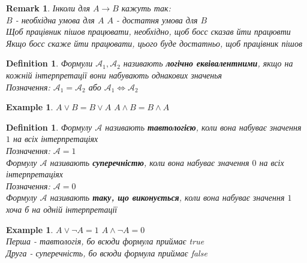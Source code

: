 \documentclass[a4paper, 14pt]{extarticle}
\theoremstyle{theoremdd}
\theoremstyle{theoremdd}
\newtheorem{definition}[theorem]{Definition}
\theoremstyle{theoremdd}
\theoremstyle{theoremdd}
\newtheorem{example}[theorem]{Example}
\theoremstyle{theoremdd}
\theoremstyle{theoremdd}
\newtheorem{remark}[theorem]{Remark}
\theoremstyle{theoremdd}
\theoremstyle{theoremdd}
\begin{document}
\begin{remark}
Інколи для $A \rightarrow B$ кажуть так:\\
$B$ - необхідна умова для $A$ \hspace{0.5cm} $A$ - достатня умова для $B$\\
Щоб працівник пішов працювати, необхідно, щоб босс сказав йти працювти\\
Якщо босс скаже йти працювати, цього буде достатньо, щоб працівник пішов
\end{remark}

\begin{definition}
Формули $\mathcal{A}_1, \mathcal{A}_2$ називають \textbf{логічно еквівалентними}, якщо на кожній інтерпретації вони набувають однакових значенья\\
Позначення: $\mathcal{A}_1 = \mathcal{A}_2$ або $\mathcal{A}_1 \Leftrightarrow \mathcal{A}_2$
\end{definition}

\begin{example}
$A \vee B = B \vee A$ \hspace{1cm} $A \wedge B = B \wedge A$
\end{example}

\begin{definition}
Формулу $\mathcal{A}$ називають \textbf{тавтологією}, коли вона набуває значення $1$ на всіх інтерпретаціях\\
Позначення: $\mathcal{A} = 1$\\
Формулу $\mathcal{A}$ називають \textbf{суперечністю}, коли вона набуває значення $0$ на всіх інтерпретаціях\\
Позначення: $\mathcal{A} = 0$\\
Формулу $\mathcal{A}$ називають \textbf{таку, що виконується}, коли вона набуває значення $1$ хоча б на одній інтерпретації\\
\end{definition}

\begin{example}
$A \vee \neg A = 1$ \hspace{1cm} $A \wedge \neg A = 0$\\
Перша - тавтологія, бо всюди формула приймає true\\
Друга - суперечність, бо всюди формула приймає false
\end{example}
\end{document}

